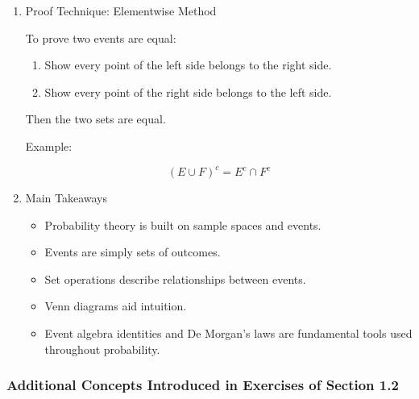 \documentclass[11pt]{article}
\begin{document}
\begin{enumerate}
\begin{enumerate}
\[
E\cup(F\cup G)
=
(E\cup F)\cup G
\]

\[
E\cap(F\cap G)
=
(E\cap F)\cap G
\]
\item Distributive Laws
\label{sec:org2219c9a}

\[
(E\cap F)\cup H
=
(E\cup H)\cap(F\cup H)
\]

\[
(E\cup F)\cap H
=
(E\cap H)\cup(F\cap H)
\]
\item De Morgan's First Law
\label{sec:orgbb105d3}

\[
(E\cup F)^c
=
E^c\cap F^c
\]
\item De Morgan's Second Law
\label{sec:orgfe88699}

\[
(E\cap F)^c
=
E^c\cup F^c
\]
\item Useful Identity
\label{sec:org813bd48}

\[
E
=
(E\cap F)
\cup
(E\cap F^c)
\]
\end{enumerate}
\item Proof Technique: Elementwise Method
\label{sec:orgf321577}

To prove two events are equal:

\begin{enumerate}
\item Show every point of the left side belongs to the right side.
\item Show every point of the right side belongs to the left side.
\end{enumerate}

Then the two sets are equal.

Example:

\[
(E\cup F)^c
=
E^c\cap F^c
\]
\item Main Takeaways
\label{sec:org0a29767}

\begin{itemize}
\item Probability theory is built on sample spaces and events.
\item Events are simply sets of outcomes.
\item Set operations describe relationships between events.
\item Venn diagrams aid intuition.
\item Event algebra identities and De Morgan's laws are fundamental tools used throughout probability.
\end{itemize}
\end{enumerate}
\subsubsection{Additional Concepts Introduced in Exercises of Section 1.2}
\label{sec:org3addcf7}
\end{document}
